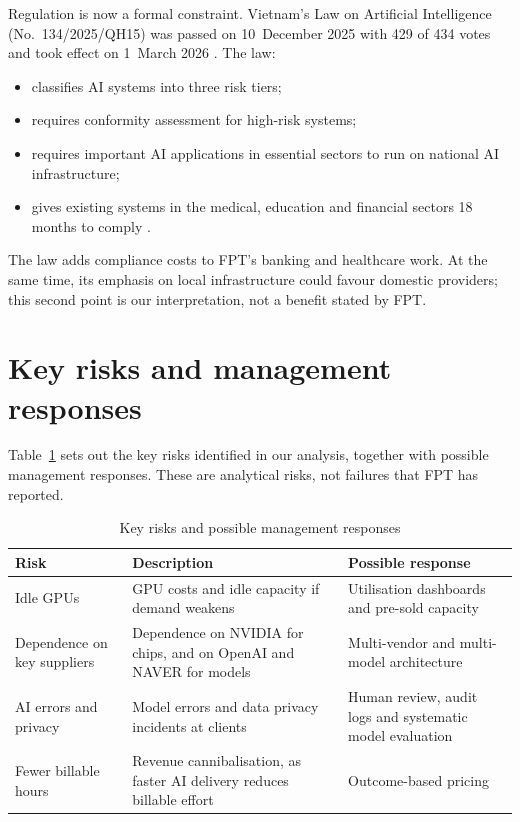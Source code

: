 \documentclass[a4paper,12pt]{report}
\begin{document}
Regulation is now a formal constraint. Vietnam's Law on Artificial Intelligence (No.~134/2025/QH15) was passed on 10~December 2025 with 429 of 434 votes and took effect on 1~March 2026 \cite{M19}. The law:

\begin{itemize}
  \item classifies AI systems into three risk tiers;
  \item requires conformity assessment for high-risk systems;
  \item requires important AI applications in essential sectors to run on national AI infrastructure;
  \item gives existing systems in the medical, education and financial sectors 18 months to comply \cite{M20}.
\end{itemize}

The law adds compliance costs to FPT's banking and healthcare work. At the same time, its emphasis on local infrastructure could favour domestic providers; this second point is our interpretation, not a benefit stated by FPT.

\section{Key risks and management responses}

Table~\ref{tab:risks} sets out the key risks identified in our analysis, together with possible management responses. These are analytical risks, not failures that FPT has reported.

\begin{table}[htbp]
  \centering
  \small
  \caption{Key risks and possible management responses}
  \label{tab:risks}
  \begin{tabular}{>{\raggedright\arraybackslash}p{2.8cm}>{\raggedright\arraybackslash}p{6.4cm}>{\raggedright\arraybackslash}p{4.6cm}}
    \toprule
    \textbf{Risk} & \textbf{Description} & \textbf{Possible response} \\
    \midrule
    Idle GPUs & GPU costs and idle capacity if demand weakens & Utilisation dashboards and pre-sold capacity \\ \addlinespace
    Dependence on key suppliers & Dependence on NVIDIA for chips, and on OpenAI and NAVER for models & Multi-vendor and multi-model architecture \\ \addlinespace
    AI errors and privacy & Model errors and data privacy incidents at clients & Human review, audit logs and systematic model evaluation \\ \addlinespace
    Fewer billable hours & Revenue cannibalisation, as faster AI delivery reduces billable effort & Outcome-based pricing \\
    \bottomrule
  \end{tabular}
\end{table}
\end{document}
